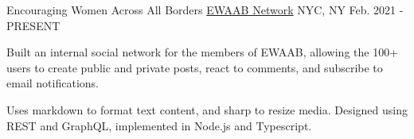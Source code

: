 \begin{cventries}
  \cventry
  {Encouraging Women Across All Borders} %
  {\href{https://ewaab.org}{EWAAB Network}} %
  {NYC, NY} %
  {Feb. 2021 - PRESENT} %
  {
    \begin{cvitems} %
      \item {Built an internal social network for the members of EWAAB, allowing the 100+ users to create public and private posts, react to comments, and subscribe to email notifications.}
      \item {Uses markdown to format text content, and sharp to resize media. Designed using REST and GraphQL, implemented in Node.js and Typescript.}
    \end{cvitems}
  }

\end{cventries}
